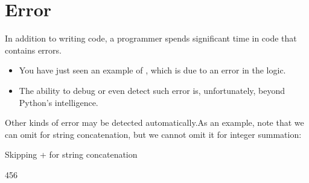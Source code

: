 \documentclass[letterpaper,10pt,english]{sphinxmanual}
\begin{document}
\section{Error}
\label{\detokenize{Lecture2/Values and Variables:error}}
In addition to writing code, a programmer spends significant time in  code that contains errors.

\begin{itemize}
\item {} 
You have just seen an example of , which is due to an error in the logic.

\item {} 
The ability to debug or even detect such error is, unfortunately, beyond Python’s intelligence.

\end{itemize}

Other kinds of error may be detected automatically.As an example, note that we can omit \sphinxcode{\sphinxupquote{+}} for string concatenation, but we cannot omit it for integer summation:

\begin{sphinxVerbatim}[commandchars=\\\{\}]
  
\end{sphinxVerbatim}

\begin{sphinxVerbatim}[commandchars=\\\{\}]
Skipping + for string concatenation
\end{sphinxVerbatim}

\begin{sphinxVerbatim}[commandchars=\\\{\}]
\PYGZsq{}456\PYGZsq{}
\end{sphinxVerbatim}

\begin{sphinxVerbatim}[commandchars=\\\{\}]
  
\end{sphinxVerbatim}
\end{document}

